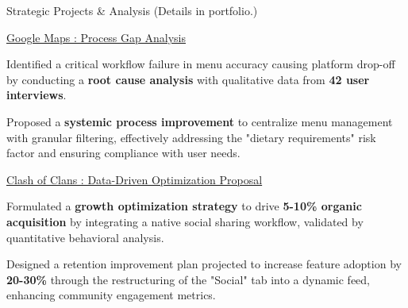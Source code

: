 \documentclass{resume} %
\begin{document}
\begin{rSection}{Strategic Projects \& Analysis {\fontsize{8}{9}\selectfont (Details in portfolio.)}\vspace{.2em}}
\begin{rSubsection}{\href{https://nabhishek.notion.site/Google-Maps-2320afeb2ea88023bfa3dfc424175e15}{Google Maps : Process Gap Analysis}}{}{}{}
\item[]
\begin{itemize}[left=-1.5em, labelsep=.1cm, labelwidth=.2cm, itemsep=0.0em]
{\item Identified a critical workflow failure in menu accuracy causing platform drop-off by conducting a \textbf{root cause analysis} with qualitative data from \textbf{42 user interviews}.}
{\item Proposed a \textbf{systemic process improvement} to centralize menu management with granular filtering, effectively addressing the "dietary requirements" risk factor and ensuring compliance with user needs.
}
\end{itemize}

\end{rSubsection}
\begin{rSubsection}{\href{https://www.abhishekn.in/clashofclans}{Clash of Clans : Data-Driven Optimization Proposal}}{}{}{}
\item[]
\begin{itemize}[left=-1.5em, labelsep=.1cm, labelwidth=.2cm, itemsep=0.0em]
{\item Formulated a \textbf{growth optimization strategy} to drive \textbf{5-10\% organic acquisition} by integrating a native social sharing workflow, validated by quantitative behavioral analysis.}
{\item Designed a retention improvement plan projected to increase feature adoption by \textbf{20-30\%} through the restructuring of the "Social" tab into a dynamic feed, enhancing community engagement metrics.}
\end{itemize}


\end{rSubsection}
\end{rSection}
\end{document}
